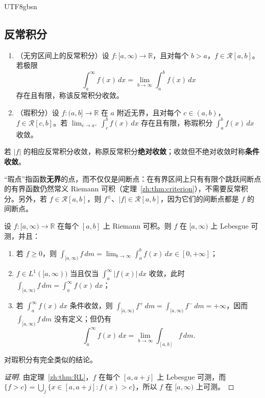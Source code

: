 \documentclass[11pt]{article}
\makeatletter
\newcommand{\envlabel}[1]{\protected@edef\@currentlabel{\themathenv}\label{#1}}
\makeatother
\begin{document}
\begin{CJK*}{UTF8}{gbsn}
\subsection{反常积分}\label{zh:sec:improper}

\begin{definition}[反常积分]
\leavevmode
\begin{enumerate}
  \item（无穷区间上的反常积分）设 $f:[a,\infty)\to\mathbb{R}$，且对每个 $b>a$，$f\in\mathcal{R}[a,b]$。若极限
  \[
  \int_{a}^{\infty}f(x)\,dx=\lim_{b\to\infty}\int_{a}^{b}f(x)\,dx
  \]
  存在且有限，称该反常积分收敛。
  \item（瑕积分）设 $f:(a,b]\to\mathbb{R}$ 在 $a$ 附近无界，且对每个 $c\in(a,b)$，$f\in\mathcal{R}[c,b]$。若 $\lim_{c\to a^{+}}\int_{c}^{b}f(x)\,dx$ 存在且有限，称瑕积分 $\int_{a}^{b}f(x)\,dx$ 收敛。
\end{enumerate}
若 $|f|$ 的相应反常积分收敛，称原反常积分\textbf{绝对收敛}；收敛但不绝对收敛时称\textbf{条件收敛}。
\end{definition}

“瑕点”指函数\textbf{无界}的点，而不仅仅是间断点：在有界区间上只有有限个跳跃间断点的有界函数仍然常义 Riemann 可积（定理~\ref{zh:thm:criterion}），不需要反常积分。另外，若 $f\in\mathcal{R}[a,b]$，则 $f^{\pm}$、$|f|\in\mathcal{R}[a,b]$，因为它们的间断点都是 $f$ 的间断点。

\begin{theorem}\envlabel{zh:thm:improper}
设 $f:[a,\infty)\to\mathbb{R}$ 在每个 $[a,b]$ 上 Riemann 可积。则 $f$ 在 $[a,\infty)$ 上 Lebesgue 可测，并且：
\begin{enumerate}
  \item 若 $f\geq0$，则 $\displaystyle\int_{[a,\infty)}f\,dm=\lim_{b\to\infty}\int_{a}^{b}f(x)\,dx\in[0,+\infty]$；
  \item $f\in L^{1}([a,\infty))$ 当且仅当 $\int_{a}^{\infty}|f(x)|\,dx$ 收敛，此时 $\displaystyle\int_{[a,\infty)}f\,dm=\int_{a}^{\infty}f(x)\,dx$；
  \item 若 $\int_{a}^{\infty}f(x)\,dx$ 条件收敛，则 $\int_{[a,\infty)}f^{+}\,dm=\int_{[a,\infty)}f^{-}\,dm=+\infty$，因而 $\int_{[a,\infty)}f\,dm$ 没有定义；但仍有
  \[
  \int_{a}^{\infty}f(x)\,dx=\lim_{b\to\infty}\int_{[a,b]}f\,dm.
  \]
\end{enumerate}
对瑕积分有完全类似的结论。
\end{theorem}

\begin{proof}[证明]
由定理~\ref{zh:thm:RL}，$f$ 在每个 $[a,a+j]$ 上 Lebesgue 可测，而 $\{f>c\}=\bigcup_{j}\{x\in[a,a+j]:f(x)>c\}$，所以 $f$ 在 $[a,\infty)$ 上可测。


\end{proof}
\end{CJK*}
\end{document}
